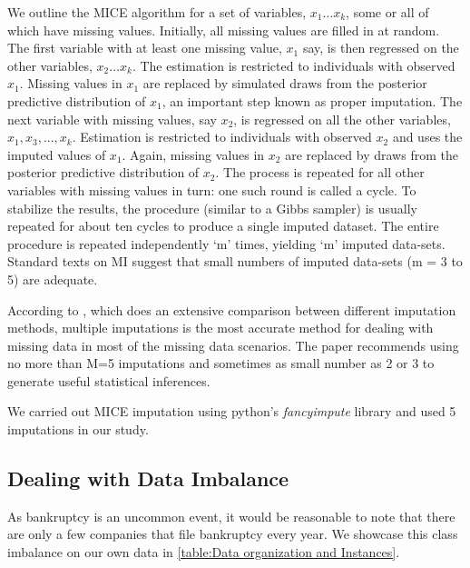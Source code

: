 We outline the MICE algorithm for a set of variables, $x_1 \dots x_k$, some or all of which have missing values. Initially, all missing values are filled in at random. The first variable with at least one missing value, $x_1$ say, is then regressed on the other variables, $x_2 \dots x_k$. The estimation is restricted to individuals with observed $x_1$. Missing values in $x_1$ are replaced by simulated draws from the posterior predictive distribution of $x_1$, an important step known as proper imputation. The next variable with missing values, say $x_2$, is regressed on all the other variables, $x_1, x_3, . . . , x_k$. Estimation is restricted to individuals with observed $x_2$ and uses the imputed values of $x_1$. Again, missing values in $x_2$ are replaced by draws from the posterior predictive distribution of $x_2$. The process is repeated for all other variables with missing values in turn: one such round is called a cycle. To stabilize the results, the procedure (similar to a Gibbs sampler) is usually repeated for about ten cycles to produce a single imputed dataset. The entire procedure is repeated independently `m' times, yielding `m' imputed data-sets. Standard texts on MI suggest that small numbers of imputed data-sets (m = 3 to 5) are adequate.


According to \cite{shrive2006dealing}, which does an extensive comparison between different imputation methods, multiple imputations is the most accurate method for dealing with missing data in most of the missing data scenarios.
The paper recommends using no more than M=5 imputations and sometimes as small number as 2 or 3 to generate useful statistical inferences. 

We carried out MICE imputation using python's \textit{fancyimpute} library and used 5 imputations in our study. 


\subsection{Dealing with Data Imbalance}
\label{sec:imbalance}
As bankruptcy is an uncommon event, it would be reasonable to note that there are only a few companies that file bankruptcy every year. We showcase this class imbalance on our own data in \autoref{table:Data organization and Instances}.


